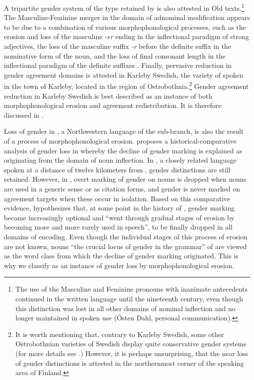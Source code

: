\documentclass[output=collectionpaper]{langsci/langscibook}
\begin{document}
A tripartite gender system of the type retained by  is also attested in Old  texts.\footnote{The use of the Masculine and Feminine pronouns with inanimate antecedents continued in the written language until the nineteenth century, even though this distinction was lost in all other domains of nominal inflection and no longer maintained in spoken use (\"{O}sten Dahl, personal communication).} The Masculine-Feminine merger in the domain of adnominal modification appears to be due to a combination of various morphophonological processes, such as the erosion and loss of the masculine \textit{-er} ending in the inflectional paradigm of strong adjectives, the loss of the masculine suffix \textit{-r} before the definite suffix in the nominative form of the noun, and the loss of final consonant length in the inflectional paradigm of the definite suffixes \citep[652--654]{Duke2010}. Finally, pervasive reduction in gender agreement domains is attested in Karleby Swedish, the variety of  spoken in the town of Karleby, located in the  region of Ostrobothnia.\footnote{It is worth mentioning that, contrary to Karleby Swedish, some other Ostrobothnian varieties of Swedish display quite conservative gender systems (for more details see \citealt[40--50]{Hulden1972}.) However, it is perhaps unsurprising, that the near loss of gender distinctions is attested in the northernmost corner of the  speaking area of Finland.} Gender agreement reduction in Karleby Swedish is best described as an instance of both morphophonological erosion and agreement redistribution. It is therefore discussed in .

Loss of gender in , a Northwestern  language of the  sub-branch, is also the result of a process of morphophonological erosion. \citet{Stilotoappear} proposes a historical-comparative analysis of gender loss in  whereby the decline of gender marking is explained as originating from the domain of noun inflection. In , a closely related language spoken at a distance of twelve kilometers from , gender distinctions are still retained. However, in , overt marking of gender on nouns is dropped when nouns are used in a generic sense or as citation forms, and gender is never marked on agreement targets when these occur in isolation. Based on this comparative evidence, \citet[27]{Stilotoappear} hypothesizes that, at some point in the history of , gender marking became increasingly optional and ``went through gradual stages of erosion by becoming more and more rarely used in speech'', to be finally dropped in all domains of encoding. Even though the individual stages of this process of erosion are not known, nouns \textendash{} ``the crucial locus of gender in the grammar'' of  \citep[27]{Stilotoappear} \textendash{} are viewed as the word class from which the decline of gender marking originated. This is why we classify  as an instance of gender loss by morphophonological erosion.
\end{document}
